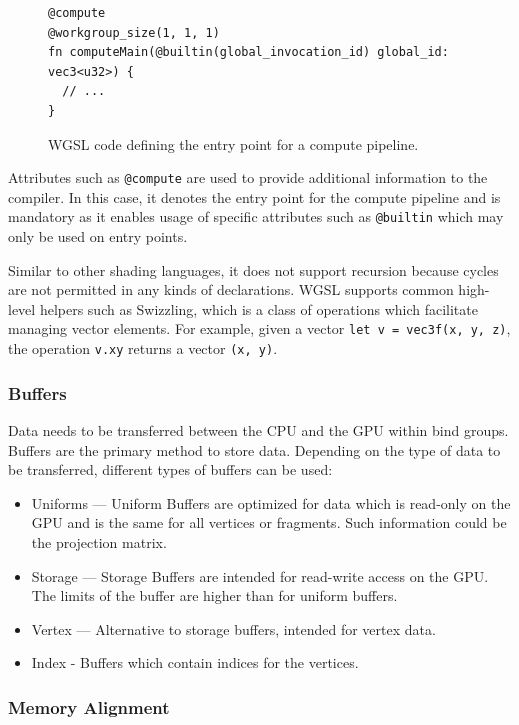 \begin{figure}[H]
  \begin{lstlisting}[style=wgsl]
@compute
@workgroup_size(1, 1, 1)
fn computeMain(@builtin(global_invocation_id) global_id: vec3<u32>) {
  // ...
}
  \end{lstlisting}
  \caption{\gls{WGSL} code defining the entry point for a compute pipeline.}
  \label{code:computePipelineWgsl}
\end{figure}

Attributes such as \texttt{@compute} are used to provide additional information to the compiler. In this case, it denotes the entry point for the compute pipeline and is mandatory as it enables usage of specific attributes such as \texttt{@builtin} which may only be used on entry points.

Similar to other shading languages, it does not support recursion because cycles are not permitted in any kinds of declarations. \gls{WGSL} supports common high-level helpers such as Swizzling, which is a class of operations which facilitate managing vector elements. For example, given a vector \verb|let v = vec3f(x, y, z)|, the operation \verb|v.xy| returns a vector \verb|(x, y)|.

\subsubsection{Buffers}

Data needs to be transferred between the CPU and the GPU within bind groups. Buffers are the primary method to store data. Depending on the type of data to be transferred, different types of buffers can be used:

\begin{itemize}
  \item{Uniforms} — Uniform Buffers are optimized for data which is read-only on the GPU and is the same for all vertices or fragments. Such information could be the projection matrix.
  \item{Storage} — Storage Buffers are intended for read-write access on the GPU. The limits of the buffer are higher than for uniform buffers.
  \item{Vertex} — Alternative to storage buffers, intended for vertex data.
  \item{Index} - Buffers which contain indices for the vertices.
\end{itemize}

\subsubsection{Memory Alignment}
\label{ch:memoryAlignmentTheory}

